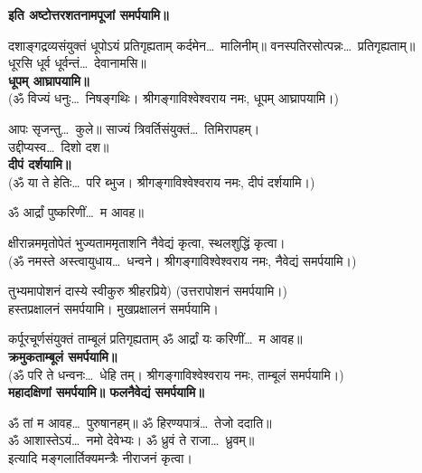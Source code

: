 \begin{center}
\textbf{इति अष्टोत्तरशतनामपूजां समर्पयामि॥}


{दशाङ्गद्रव्यसंयुक्तं धूपोऽयं प्रतिगृह्यताम्}
कर्दमेन\ldots\ मालिनीम्॥ वनस्पतिरसोत्पन्नः\ldots\ प्रतिगृह्यताम्॥\\
धूरसि धूर्व धूर्वन्तं\ldots\ देवानामसि॥\\
\textbf{\devAya{} धूपम् आघ्रापयामि॥}\\
(ॐ विज्यं धनुः\ldots\ निषङ्गथिः। श्रीगङ्गाविश्वेश्वराय नमः, धूपम् आघ्रापयामि।)


आपः सृजन्तु\ldots\ कुले॥ साज्यं त्रिवर्तिसंयुक्तं\ldots\ तिमिरापहम्।\\
उद्दीप्यस्व\ldots\ दिशो दश॥\\
\textbf{\devAya{} दीपं दर्शयामि॥}\\
(ॐ या ते हेतिः\ldots\ परि ब्भुज। श्रीगङ्गाविश्वेश्वराय नमः, दीपं दर्शयामि।)


ॐ आर्द्रां पुष्करिणीं\ldots\ म आवह॥

{क्षीरान्नममृतोपेतं भुज्यताममृताशनि}
नैवेद्यं कृत्वा, स्थलशुद्धिं कृत्वा।\\
(ॐ नमस्ते अस्त्वायुधाय\ldots\ धन्वने। श्रीगङ्गाविश्वेश्वराय नमः, नैवेद्यं समर्पयामि।)

{तुभ्यमापोशनं दास्ये स्वीकुरु श्रीहरप्रिये)}
(उत्तरापोशनं समर्पयामि।)\\
हस्तप्रक्षालनं समर्पयामि। मुखप्रक्षालनं समर्पयामि।


{कर्पूरचूर्णसंयुक्तं ताम्बूलं प्रतिगृह्यताम्}
ॐ आर्द्रां यः करिणीं\ldots\ म आवह॥\\
\textbf{\devAya{} क्रमुकताम्बूलं समर्पयामि॥}\\
(ॐ परि ते धन्वनः\ldots\ धेहि तम्। श्रीगङ्गाविश्वेश्वराय नमः, ताम्बूलं समर्पयामि।)\\
\textbf{\devAya{} महादक्षिणां समर्पयामि॥ \devAya{} फलनैवेद्यं समर्पयामि॥}


ॐ तां म आवह\ldots\ पुरुषानहम्॥ ॐ हिरण्यपात्रं\ldots\ तेजो ददाति॥\\
ॐ आशास्तेऽयं\ldots\ नमो देवेभ्यः। ॐ ध्रुवं ते राजा\ldots\ ध्रुवम्॥\\
इत्यादि मङ्गलार्तिक्यमन्त्रैः नीराजनं कृत्वा।


\end{center}
